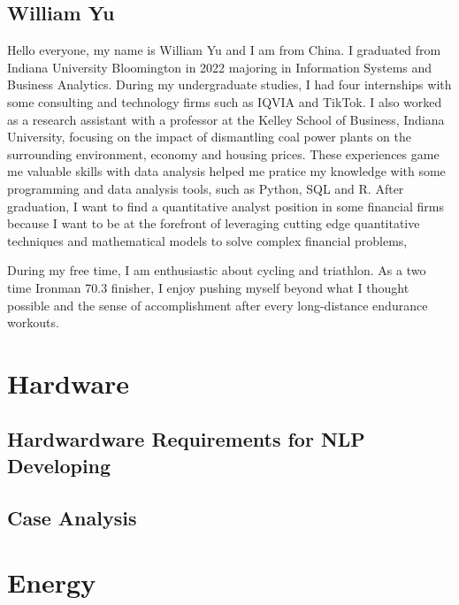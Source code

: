 \documentclass[
]{book}
\begin{document}
\hypertarget{william-yu}{%
\section{William Yu}\label{william-yu}}

Hello everyone, my name is William Yu and I am from China. I graduated from Indiana University Bloomington in 2022 majoring in Information Systems and Business Analytics. During my undergraduate studies, I had four internships with some consulting and technology firms such as IQVIA and TikTok. I also worked as a research assistant with a professor at the Kelley School of Business, Indiana University, focusing on the impact of dismantling coal power plants on the surrounding environment, economy and housing prices. These experiences game me valuable skills with data analysis helped me pratice my knowledge with some programming and data analysis tools, such as Python, SQL and R. After graduation, I want to find a quantitative analyst position in some financial firms because I want to be at the forefront of leveraging cutting edge quantitative techniques and mathematical models to solve complex financial problems,

During my free time, I am enthusiastic about cycling and triathlon. As a two time Ironman 70.3 finisher, I enjoy pushing myself beyond what I thought possible and the sense of accomplishment after every long-distance endurance workouts.

\hypertarget{hardware}{%
\chapter{Hardware}\label{hardware}}

\hypertarget{hardwardware-requirements-for-nlp-developing}{%
\section{Hardwardware Requirements for NLP Developing}\label{hardwardware-requirements-for-nlp-developing}}

\hypertarget{case-analysis}{%
\section{Case Analysis}\label{case-analysis}}

\hypertarget{energy}{%
\chapter{Energy}\label{energy}}
\end{document}
